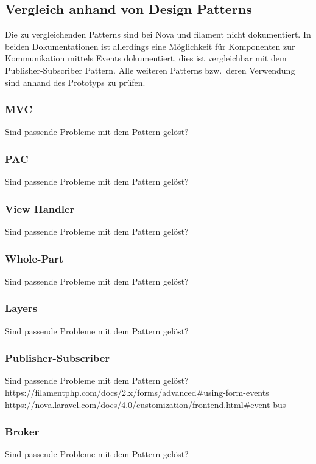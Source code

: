 \color{red}

\subsection{Vergleich anhand von Design Patterns}
Die zu vergleichenden Patterns sind bei Nova und filament nicht dokumentiert.
In beiden Dokumentationen ist allerdings eine Möglichkeit für Komponenten zur Kommunikation mittels Events dokumentiert, dies ist vergleichbar mit dem Publisher-Subscriber Pattern.
Alle weiteren Patterns bzw.\ deren Verwendung sind anhand des Prototyps zu prüfen.

\subsubsection{MVC}
Sind passende Probleme mit dem Pattern gelöst?

\subsubsection{PAC}
Sind passende Probleme mit dem Pattern gelöst?

\subsubsection{View Handler}
Sind passende Probleme mit dem Pattern gelöst?

\subsubsection{Whole-Part}
Sind passende Probleme mit dem Pattern gelöst?

\subsubsection{Layers}
Sind passende Probleme mit dem Pattern gelöst?

\subsubsection{Publisher-Subscriber}
Sind passende Probleme mit dem Pattern gelöst?
https://filamentphp.com/docs/2.x/forms/advanced#using-form-events
https://nova.laravel.com/docs/4.0/customization/frontend.html#event-bus

\subsubsection{Broker}
Sind passende Probleme mit dem Pattern gelöst?

